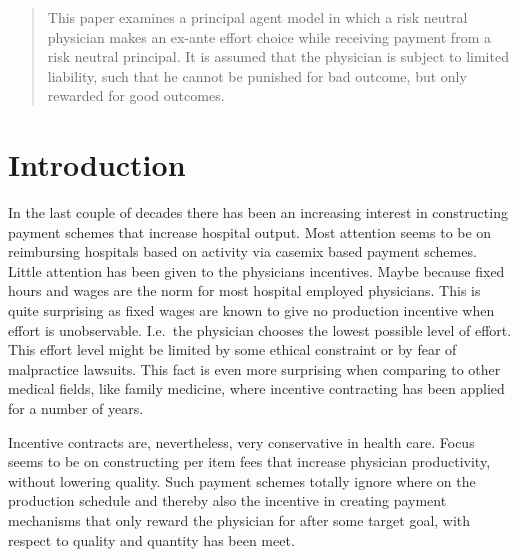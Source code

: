 


\maketitle
\begin{abstract}
This paper examines a principal agent model in which a risk neutral physician makes an ex-ante effort choice while receiving payment from a risk neutral
principal. It is assumed that the physician is subject to limited liability, such
that he cannot be punished for bad outcome, but only rewarded for good outcomes.
\VCModified
\end{abstract}

\section{Introduction} %
\label{sec:introduction}
In the last couple of decades there has been an increasing interest in constructing payment schemes that increase hospital output. Most attention seems to be on reimbursing hospitals based on activity via casemix based payment schemes. Little attention has been given to the physicians incentives. Maybe because fixed hours and wages are the norm for most hospital employed physicians. This is quite surprising as fixed wages are known to give no production incentive when effort is unobservable.  I.e.\ the physician chooses the lowest possible level of effort. This effort level might be limited by some ethical constraint or by fear of malpractice lawsuits. This fact is even more surprising when comparing to other medical fields, like family medicine, where incentive contracting has been applied for a number of years. 

Incentive contracts are, nevertheless, very conservative in health care. Focus seems to be on constructing per item fees that increase physician productivity, without lowering quality. Such payment schemes totally ignore where on the production schedule and thereby also the incentive in creating payment mechanisms that only reward the physician for after some target goal, with respect to quality and quantity has been meet. 

